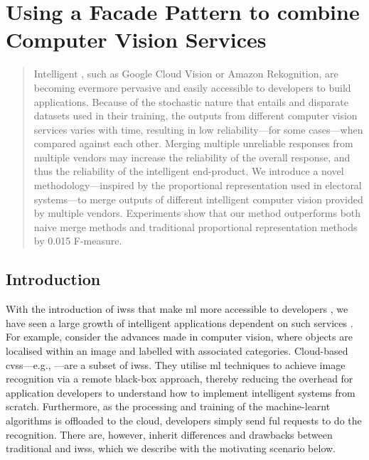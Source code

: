 \chapter[Using a Facade Pattern to combine Computer Vision Services]
{Using a Facade Pattern to combine Computer Vision Services}
\label{ch:icwe2019}
\graphicspath{{mainmatter/publications/figures/icwe2019/}}

\glsresetall
\begin{abstract}
Intelligent , such as Google Cloud Vision or Amazon Rekognition, are becoming evermore pervasive and easily accessible to developers to build applications.
Because of the stochastic nature that  entails and disparate datasets used in their training, the outputs from different computer vision services varies with time, resulting in low reliability---for some cases---when compared against each other.
Merging multiple unreliable  responses from multiple vendors may increase the reliability of the overall response, and thus the reliability of the intelligent end-product.
We introduce a novel methodology---inspired by the proportional representation used in electoral systems---to merge outputs of different intelligent computer vision  provided by multiple vendors.
Experiments show that our method outperforms both naive merge methods and traditional proportional representation methods by 0.015 F-measure.
\end{abstract}
\glsresetall

\section{Introduction}

With the introduction of \glspl{iws} that make \gls{ml} more accessible to developers \citep{Ribeiro:2015dz,Hwang:2017tr}, we have seen a large growth of intelligent applications dependent on such services .
For example, consider the advances made in computer vision, where objects are localised within an image and labelled with associated categories.
Cloud-based \glspl{cvs}---e.g., ---are a subset of \glspl{iws}. They utilise \gls{ml} techniques to achieve image recognition via a remote black-box approach, thereby reducing the overhead for application developers to understand how to implement intelligent systems from scratch. Furthermore, as the processing and training of the machine-learnt algorithms is offloaded to the cloud, developers simply send ful  requests to do the recognition. There are, however, inherit differences and drawbacks between traditional  and \glspl{iws}, which we describe with the motivating scenario below.

